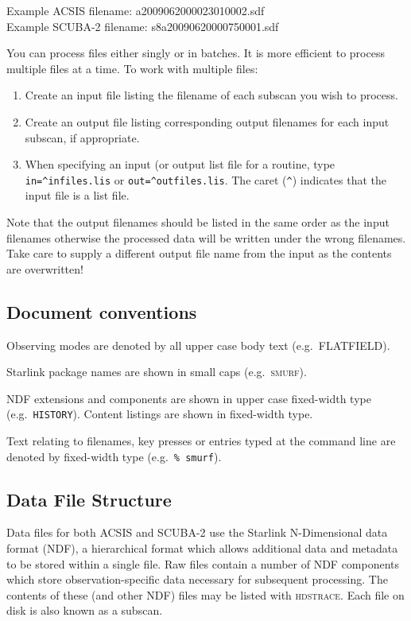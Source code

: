 \documentclass[twoside,11pt]{article}
\newcommand{\xref}[3]{#1}
\renewcommand{\_}{\texttt{\symbol{95}}}
\newcommand{\HDSTRACE}{\textsc{hdstrace}}
\newcommand{\HDSTRACEref}{\xref{\HDSTRACE}{sun102}{}}
\newcommand{\ndf}{\xref{NDF}{sun33}{}}
\begin{document}
Example ACSIS filename: a20090620\_00023\_01\_0002.sdf\\
Example SCUBA-2 filename: s8a20090620\_00075\_0001.sdf

You can process files either singly or in batches. It is more
efficient to process multiple files at a time. To work with multiple
files:
\begin{enumerate}
\item Create an input file listing the filename of each subscan you
  wish to process.
\item Create an output file listing corresponding output filenames for
  each input subscan, if appropriate.
\item When specifying an input (or output list file for a routine,
  type \verb+in=^infiles.lis+ or \verb+out=^outfiles.lis+. The caret
  (\verb+^+) indicates that the input file is a list file.
\end{enumerate}
Note that the output filenames should be listed in the same order as
the input filenames otherwise the processed data will be written under
the wrong filenames. Take care to supply a different output file name
from the input as the contents are overwritten!

\subsection{Document conventions}

Observing modes are denoted by all upper case body text (e.g.\
FLATFIELD).

Starlink package names are shown in small caps (e.g.\ \textsc{smurf}).

NDF extensions and components are shown in upper case fixed-width type
(e.g.\ \texttt{HISTORY}). Content listings are shown in fixed-width type.

Text relating to filenames, key presses or entries typed at the
command line are denoted by fixed-width type (e.g.\ \texttt{\% smurf}).


\subsection{Data File Structure}

Data files for both ACSIS and SCUBA-2 use the Starlink N-Dimensional
data format (\ndf), a hierarchical format which allows
additional data and metadata to be stored within a single file. Raw
files contain a number of NDF components which store
observation-specific data necessary for subsequent processing. The
contents of these (and other NDF) files may be listed with
\HDSTRACEref. Each file on disk is also known as a subscan.
\end{document}
